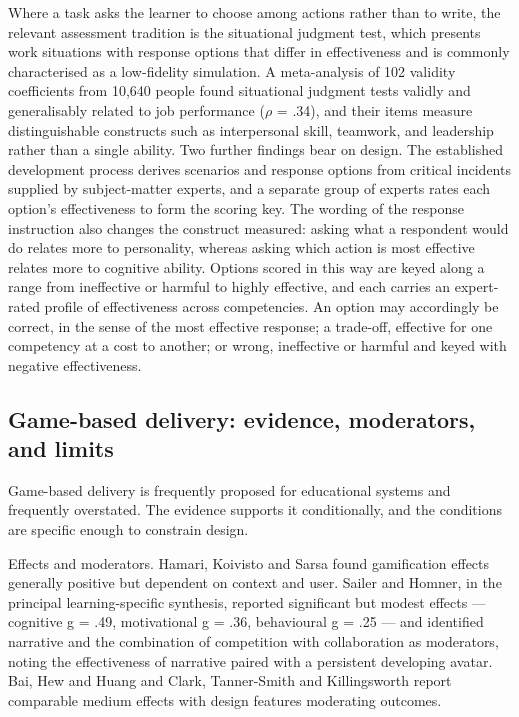 Where a task asks the learner to choose among actions rather than to write, the relevant assessment tradition is the situational judgment test, which presents work situations with response options that differ in effectiveness and is commonly characterised as a low-\allowbreak{}fidelity simulation\cite{r23}. A meta-\allowbreak{}analysis of 102 validity coefficients from 10,640 people found situational judgment tests validly and generalisably related to job performance ($\rho$ = .34)\cite{r24}, and their items measure distinguishable constructs such as interpersonal skill, teamwork, and leadership rather than a single ability\cite{r25}. Two further findings bear on design. The established development process derives scenarios and response options from critical incidents supplied by subject-\allowbreak{}matter experts\cite{r26}, and a separate group of experts rates each option's effectiveness to form the scoring key\cite{r27}. The wording of the response instruction also changes the construct measured: asking what a respondent would do relates more to personality, whereas asking which action is most effective relates more to cognitive ability\cite{r28}. Options scored in this way are keyed along a range from ineffective or harmful to highly effective, and each carries an expert-\allowbreak{}rated profile of effectiveness across competencies. An option may accordingly be correct, in the sense of the most effective response; a trade-off, effective for one competency at a cost to another; or wrong, ineffective or harmful and keyed with negative effectiveness.

\subsection{Game-based delivery: evidence, moderators, and limits}

Game-based delivery is frequently proposed for educational systems and frequently overstated. The evidence supports it conditionally, and the conditions are specific enough to constrain design.

Effects and moderators. Hamari, Koivisto and Sarsa\cite{r29} found gamification effects generally positive but dependent on context and user. Sailer and Homner\cite{r30}, in the principal learning-\allowbreak{}specific synthesis, reported significant but modest effects --- cognitive g = .49, motivational g = .36, behavioural g = .25 --- and identified narrative and the combination of competition with collaboration as moderators, noting the effectiveness of narrative paired with a persistent developing avatar. Bai, Hew and Huang\cite{r31} and Clark, Tanner-\allowbreak{}Smith and Killingsworth\cite{r32} report comparable medium effects with design features moderating outcomes.

